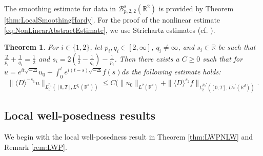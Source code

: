 \documentclass{amsart}
\newtheorem{theorem}{Theorem}[section]
\theoremstyle{definition}
\newcommand{\R}{\mathbb{R}}
\numberwithin{equation}{section}
\begin{document}
The smoothing estimate for data in $\mathcal{B}^{s}_{p,2,2}(\R^2)$ is provided by Theorem \ref{thm:LocalSmoothingHardy}.  For the proof of the nonlinear estimate \eqref{eq:NonLinearAbstractEstimate}, we use Strichartz estimates (cf. \cite{KeelTao1998}).
 
\begin{theorem}\label{thm:StrichartzEstimates}
For $i\in\{1,2\}$, let $p_i, q_i \in[2,\infty]$, $q_i \neq \infty$, and $s_{i}\in\R$ be such that $\frac{2}{p_i} + \frac{1}{q_i} = \frac{1}{2}$ and $s_i = 2( \frac{1}{2} - \frac{1}{q_i} ) - \frac{1}{p_i}$. Then there exists a $C\geq0$ such that
for $u = e^{it \sqrt{- \Delta}} u_0 + \int_0^t e^{i(t-s) \sqrt{-\Delta}} f(s) ds$ the following estimate holds:
\begin{equation*}
\| \langle D \rangle^{-s_1} u \|_{L_t^{p_1}([0,T],L^{q_1}(\R^d))} \leq C (\| u_0 \|_{L^2(\R^d)} + \| \langle D \rangle^{s_2} f \|_{L_t^{p_2'}([0,T],L^{q_2'}(\R^d))}.
\end{equation*}
\end{theorem}


\subsection{Local well-posedness results}\label{subsec:localwell}

We begin with the local well-posedness result in Theorem \ref{thm:LWPNLW} and Remark \ref{rem:LWP}. 
\end{document}
